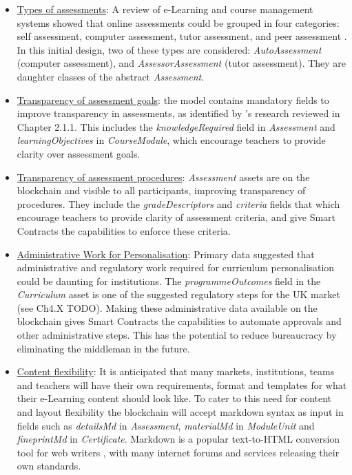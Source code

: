 \begin{itemize}
    \setlength\itemsep{0em}            
    \item \underline{Types of assessments}: A review of e-Learning and course management systems showed that online assessments could be 
    grouped in four categories: self assessment, computer assessment, tutor assessment, and peer assessment 
    \citep[p.68]{paulsen2004online}. In this initial design, two of these types are considered: \textit{AutoAssessment} (computer 
    assessment), and \textit{AssessorAssessment} (tutor assessment). They are daughter classes of the abstract \textit{Assessment}.
    \item \underline{Transparency of assessment goals}: the model contains mandatory fields to improve transparency in assessments, as identified by 
    \citet{suhre2013determinants}'s research reviewed in Chapter 2.1.1. This includes the \textit{knowledgeRequired} field 
    in \textit{Assessment} and \textit{learningObjectives} in \textit{CourseModule}, which encourage teachers to provide 
    clarity over assessment goals. 
    \item \underline{Transparency of assessment procedures}: \textit{Assessment} assets are on the blockchain and visible to all participants, 
    improving transparency of procedures. 
    They include the \textit{gradeDescriptors} and \textit{criteria} fields that which encourage teachers to provide clarity of 
    assessment criteria, and give Smart Contracts the capabilities to enforce these criteria.
    \item \underline{Administrative Work for Personalisation}: Primary data suggested that administrative and regulatory work required for 
    curriculum personalisation could be daunting for institutions. The \textit{programmeOutcomes} field in the \textit{Curriculum} asset is one of 
    the suggested regulatory steps for the UK market (see Ch4.X TODO). Making these administrative data available on the blockchain 
    gives Smart Contracts the capabilities to automate approvals and other administrative steps. This has the potential to reduce 
    bureaucracy by eliminating the middleman in the future.
    \item \underline{Content flexibility}: It is anticipated that many markets, institutions, teams and teachers 
    will have their own requirements, format and templates for what their e-Learning content should look like. To cater to 
    this need for content and layout flexibility the blockchain will accept markdown syntax as input in fields such as 
    \textit{detailsMd} in \textit{Assessment}, \textit{materialMd} in \textit{ModuleUnit} and \textit{fineprintMd} in \textit{Certificate}. 
    Markdown is a popular text-to-HTML conversion tool for web writers \citep{gruber2004markdown}, with many internet forums and 
    services releasing their own standards.
\end{itemize}

